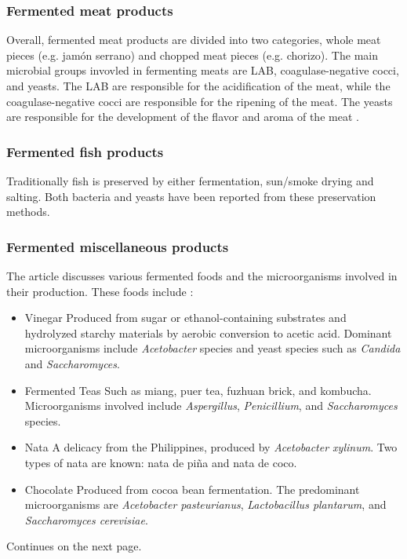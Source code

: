 \subsubsection*{Fermented meat products}
Overall, fermented meat products are divided into two categories, whole meat pieces (e.g. jamón serrano) and chopped meat pieces (e.g. chorizo). The main microbial groups invovled in fermenting meats are LAB, coagulase-negative cocci, and yeasts. The LAB are responsible for the acidification of the meat, while the coagulase-negative cocci are responsible for the ripening of the meat. The yeasts are responsible for the development of the flavor and aroma of the meat \cite*{L1-DiversityMicro}.

\subsubsection*{Fermented fish products}
Traditionally fish is preserved by either fermentation, sun/smoke drying
and salting. Both bacteria and yeasts have been reported from these preservation methods. 

\subsubsection*{Fermented miscellaneous products}
The article discusses various fermented foods and the microorganisms involved in their production. These foods include \cite*{L1-DiversityMicro}:

\begin{highlight}
    \begin{itemize}
        \item Vinegar
        \subitem Produced from sugar or ethanol-containing substrates and hydrolyzed starchy materials by 
        \subitem aerobic conversion to acetic acid.
        \subitem Dominant microorganisms include \textit{Acetobacter} species and yeast species such as \textit{Candida} and 
        \subitem \textit{Saccharomyces}.
        \vspace*{0.5em}

        \item Fermented Teas
        \subitem Such as miang, puer tea, fuzhuan brick, and kombucha.
        \subitem Microorganisms involved include \textit{Aspergillus}, \textit{Penicillium}, and \textit{Saccharomyces} species.
        \vspace*{0.5em}

        \item Nata
        \subitem A delicacy from the Philippines, produced by \textit{Acetobacter xylinum}.
        \subitem Two types of nata are known: nata de piña and nata de coco.
        \vspace*{0.5em}

        \item Chocolate
        \subitem Produced from cocoa bean fermentation. 
        \subitem The predominant microorganisms are \textit{Acetobacter pasteurianus}, \textit{Lactobacillus plantarum}, and 
        \subitem \textit{Saccharomyces cerevisiae}.

    \end{itemize}
\end{highlight}
Continues on the next page.

